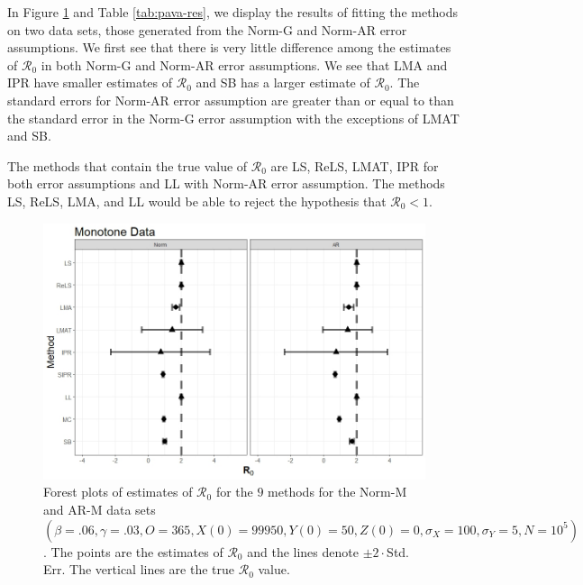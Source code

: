 \documentclass[12pt]{article}
\newcommand{\xxsir}{\ensuremath{9} } %
\newcommand{\rr}{\ensuremath{\mathcal{R}_0}}
\begin{document}
In Figure \ref{fig:pava-res} and Table \ref{tab:pava-res}, we display the results of fitting the methods on two data sets, those generated from the Norm-G and Norm-AR error assumptions.  We first see that there is very little difference among the estimates of $\rr$ in both Norm-G and Norm-AR error assumptions.  We see that LMA and IPR have smaller estimates of $\rr$ and SB has a larger estimate of $\rr$.  The standard errors for Norm-AR error assumption are greater than or equal to than the standard error in the Norm-G error assumption with the exceptions of LMAT and SB.

The methods that contain the true value of $\rr$ are LS, ReLS, LMAT, IPR for both error assumptions and LL with Norm-AR error assumption.  The methods LS, ReLS, LMA, and LL would be able to reject the hypothesis that $\rr < 1$.

\begin{figure}[H]
	\centering
	\includegraphics[scale=0.5]{images/mono.jpeg}
	\caption{Forest plots of estimates of $\rr$ for the \xxsir methods for the Norm-M and AR-M data sets $(\beta=.06, \gamma=.03, O=365, X(0)=99950, Y(0)=50, Z(0)=0, \sigma_X=100, \sigma_Y=5, N=10^5)$.  The points are the estimates of $\rr$ and the lines denote $\pm 2\cdot $Std. Err.  The vertical lines are the true $\rr$ value.}
	\label{fig:pava-res}
\end{figure}
\end{document}
